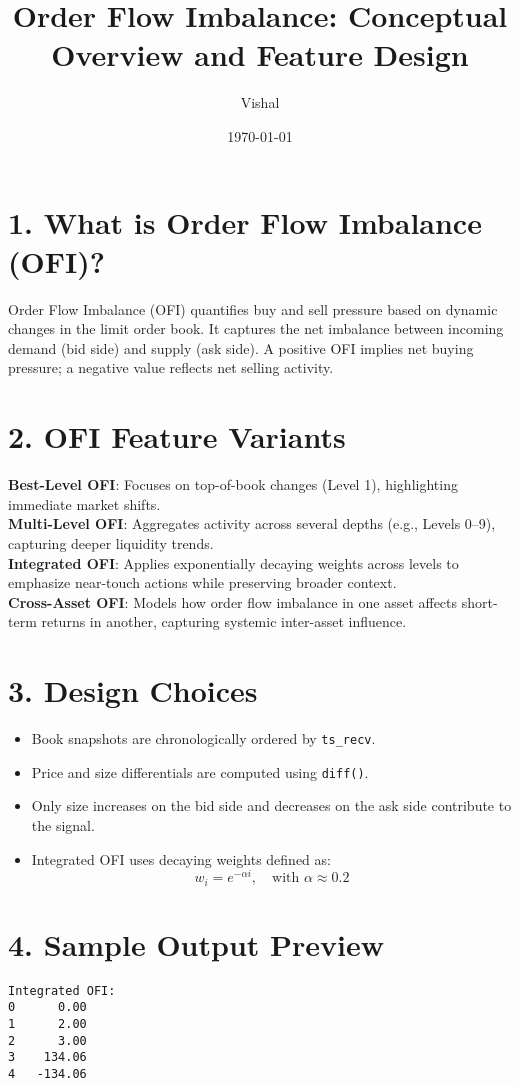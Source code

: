 \documentclass{article}
\title{Order Flow Imbalance: Conceptual Overview and Feature Design}
\author{Vishal}
\date{\today}
\begin{document}
\maketitle

\section*{1. What is Order Flow Imbalance (OFI)?}
Order Flow Imbalance (OFI) quantifies buy and sell pressure based on dynamic changes in the limit order book. It captures the net imbalance between incoming demand (bid side) and supply (ask side). A positive OFI implies net buying pressure; a negative value reflects net selling activity.

\section*{2. OFI Feature Variants}
\textbf{Best-Level OFI}: Focuses on top-of-book changes (Level 1), highlighting immediate market shifts.\\
\textbf{Multi-Level OFI}: Aggregates activity across several depths (e.g., Levels 0–9), capturing deeper liquidity trends.\\
\textbf{Integrated OFI}: Applies exponentially decaying weights across levels to emphasize near-touch actions while preserving broader context.\\
\textbf{Cross-Asset OFI}: Models how order flow imbalance in one asset affects short-term returns in another, capturing systemic inter-asset influence.

\section*{3. Design Choices}
\begin{itemize}
  \item Book snapshots are chronologically ordered by \texttt{ts\_recv}.
  \item Price and size differentials are computed using \texttt{diff()}.
  \item Only size increases on the bid side and decreases on the ask side contribute to the signal.
  \item Integrated OFI uses decaying weights defined as:
    \[
      w_i = e^{-\alpha i}, \quad \text{with } \alpha \approx 0.2
    \]
\end{itemize}

\section*{4. Sample Output Preview}
\begin{verbatim}
Integrated OFI:
0      0.00
1      2.00
2      3.00
3    134.06
4   -134.06
\end{verbatim}
\end{document}
